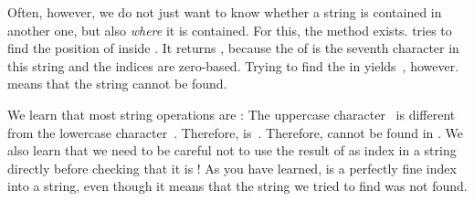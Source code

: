 Often, however, we do not just want to know whether a string is contained in another one, but also \emph{where} it is contained.
For this, the  method exists.
 tries to find the position of  inside .
It returns , because the  of  is the seventh character in this string and the indices are zero-based.
Trying to find the  in  yields~, however.
 means that the string cannot be found.

We learn that most string operations are \emph{}:
The uppercase character~ is different from the lowercase character~.
Therefore,  is~.
Therefore,  cannot be found in .
We also learn that we need to be careful not to use the result of  as index in a string directly before checking that it is !
As you have learned,  is a perfectly fine index into a string, even though it means that the string we tried to find was not found.

